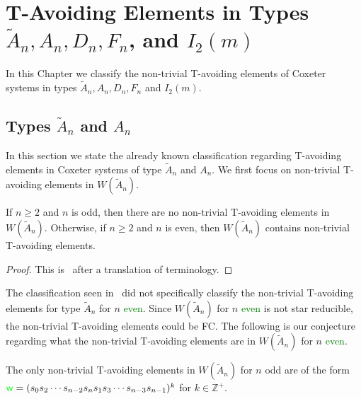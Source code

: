 \chapter{T-Avoiding Elements in Types $\widetilde{A}_n, A_n, D_n, F_n$, and $I_2(m)$}\label{chap:TandTavoid}

In this Chapter we classify the non-trivial T-avoiding elements of Coxeter systems in types $\widetilde{A}_n, A_n, D_n, F_n$ and $I_2(m)$.


\section{Types $\widetilde{A}_n$ and $A_n$}\label{sec:tavoidA}
In this section we state the already known classification regarding T-avoiding elements in Coxeter systems of type $\widetilde{A}_n$ and $A_n$. We first focus on non-trivial T-avoiding elements in $W(\widetilde{A}_n)$.

\begin{proposition}
 If $n \geq 2$ and $n$ is odd, then there are no non-trivial T-avoiding elements in $W(\widetilde{A}_n)$. Otherwise, if $n \geq 2$ and $n$ is even\textcolor{green}{,} then $W(\widetilde{A}_n)$ contains non-trivial T-avoiding elements.
\begin{proof}
	This is~\cite[Proposition~3.1.2]{Fan1999} after a translation of terminology.\qedhere
\end{proof}
\end{proposition}



The classification seen in~\cite{Fan1999} did not specifically classify the non-trivial T-avoiding elements for type $\widetilde{A}_n$ for $n$ \textcolor{green}{even}. Since $W(\widetilde{A}_n)$ for $n$ \textcolor{green}{even} is not star reducible, the non-trivial T-avoiding elements could be FC. The following is our conjecture regarding what the non-trivial T-avoiding elements are in $W(\widetilde{A}_n)$ for $n$ \textcolor{green}{even}.
\begin{conjecture}
	The only non-trivial T-avoiding elements in $W(\widetilde{A}_n)$ for $n$ odd are of the form $\textcolor{green}{\mathsf{w}}=(s_0s_2 \cdots s_{n-2}s_ns_1s_3 \cdots s_{n-3}s_{n-1})^k$  for $k \in \mathbb{Z}^+$. 
\end{conjecture} 


